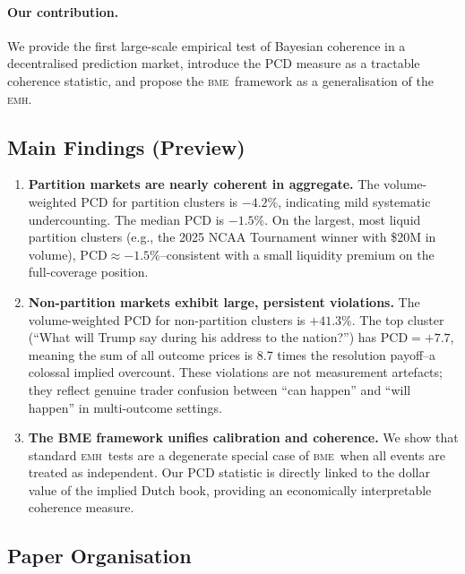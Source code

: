 \documentclass[12pt,a4paper]{article}
\theoremstyle{definition}
\theoremstyle{remark}
\newcommand{\PCD}{\mathrm{PCD}}
\newcommand{\EMH}{\textsc{emh}}
\newcommand{\BME}{\textsc{bme}}
\begin{document}
\paragraph{Our contribution.}
We provide the first large-scale empirical test of Bayesian coherence in a
decentralised prediction market, introduce the $\PCD$ measure as a tractable
coherence statistic, and propose the \BME\ framework as a generalisation of
the \EMH.

\subsection{Main Findings (Preview)}

\begin{enumerate}[label=(\arabic*)]
  \item \textbf{Partition markets are nearly coherent in aggregate.}
    The volume-weighted $\PCD$ for partition clusters is $-4.2\%$, indicating mild
    systematic undercounting. The median $\PCD$ is $-1.5\%$.
    On the largest, most liquid partition clusters (e.g., the 2025 NCAA Tournament
    winner with \$20M in volume), $\PCD \approx -1.5\%$--consistent with a
    small liquidity premium on the full-coverage position.

  \item \textbf{Non-partition markets exhibit large, persistent violations.}
    The volume-weighted $\PCD$ for non-partition clusters is $+41.3\%$.
    The top cluster (``What will Trump say during his address to the nation?'')
    has $\PCD = +7.7$, meaning the sum of all outcome prices is 8.7 times
    the resolution payoff--a colossal implied overcount.
    These violations are not measurement artefacts; they reflect genuine
    trader confusion between ``can happen'' and ``will happen'' in
    multi-outcome settings.

  \item \textbf{The BME framework unifies calibration and coherence.}
    We show that standard \EMH\ tests are a degenerate special case of \BME\
    when all events are treated as independent. Our $\PCD$ statistic is
    directly linked to the dollar value of the implied Dutch book, providing
    an economically interpretable coherence measure.
\end{enumerate}

\subsection{Paper Organisation}
\end{document}

